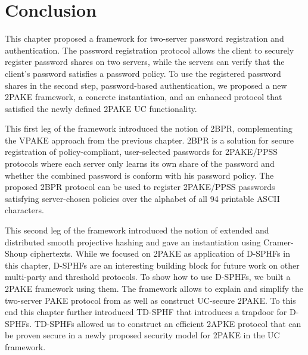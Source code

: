 









\section{Conclusion} \label{sec:2pakeConclusion}
This chapter proposed a framework for two-server password registration and authentication.
The password registration protocol allows the client to securely register password shares on two servers, while the servers can verify that the client's password satisfies a password policy.
To use the registered password shares in the second step, password-based authentication, we proposed a new \ac{2PAKE} framework, a concrete instantiation, and an enhanced protocol that satisfied the newly defined \ac{2PAKE} \ac{UC} functionality.

This first leg of the framework introduced the notion of \ac{2BPR}, complementing the \ac{VPAKE} approach from the previous chapter.
\ac{2BPR} is a solution for secure registration of policy-compliant, user-selected passwords for \ac{2PAKE}/\ac{PPSS} protocols where each server only learns its own share of the password and whether the combined password is conform with his password policy.
The proposed \ac{2BPR} protocol can be used to register \ac{2PAKE}/\ac{PPSS} passwords satisfying server-chosen policies over the alphabet of all 94 printable \ac{ASCII} characters.

This second leg of the framework introduced the notion of extended and distributed smooth projective hashing and gave an instantiation using Cramer-Shoup ciphertexts.
While we focused on \ac{2PAKE} as application of \acp{D-SPHF} in this chapter, \acp{D-SPHF} are an interesting building block for future work on other multi-party and threshold protocols.
To show how to use \acp{D-SPHF}, we built a \ac{2PAKE} framework using them.
The framework allows to explain and simplify the two-server PAKE protocol from \cite{Katz2012a} as well as construct \ac{UC}-secure \ac{2PAKE}.
To this end this chapter further introduced \ac{TD-SPHF} that introduces a trapdoor for \acp{D-SPHF}.
\acp{TD-SPHF} allowed us to construct an efficient \ac{2APKE} protocol that can be proven secure in a newly proposed security model for \ac{2PAKE} in the \ac{UC} framework.
